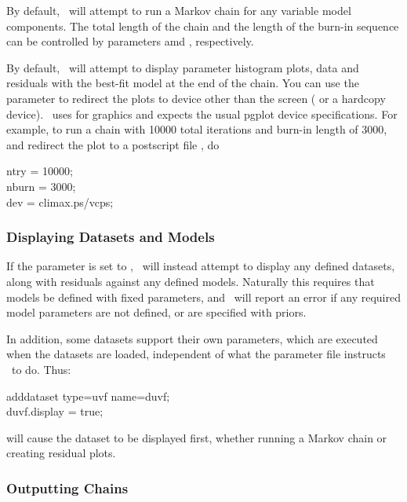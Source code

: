 By default, \climax\ will attempt to run a Markov chain for any
variable model components.  The total length of the chain and the
length of the burn-in sequence can be controlled by parameters
 amd , respectively.

By default, \climax\ will attempt to display parameter histogram
plots, data and residuals with the best-fit model at the end of the
chain.  You can use the  parameter to redirect the plots to
device other than the screen ( or a
hardcopy device).  \climax\ uses  for graphics and
expects the usual pgplot device specifications.  For example, to run a
chain with 10000 total iterations and burn-in length of 3000, and
redirect the plot to a postscript file , do

\begin{myindentpar}{3cm}
ntry = 10000;\\
nburn = 3000;\\
dev = climax.ps/vcps;
\end{myindentpar}

\subsubsection{Displaying Datasets and Models}

If the  parameter is set to , \climax\ will
instead attempt to display any defined datasets, along with residuals
against any defined models. Naturally this requires that models be
defined with fixed parameters, and \climax\ will report an error if
any required model parameters are not defined, or are specified with
priors.

In addition, some datasets support their own 
parameters, which are executed when the datasets are loaded,
independent of what the parameter file instructs \climax\ to do.  Thus:

\begin{myindentpar}{3cm}
adddataset type=uvf name=duvf;\\
duvf.display = true;
\end{myindentpar}

will cause the dataset to be displayed first, whether running a Markov
chain or creating residual plots.

\subsubsection{Outputting Chains}

